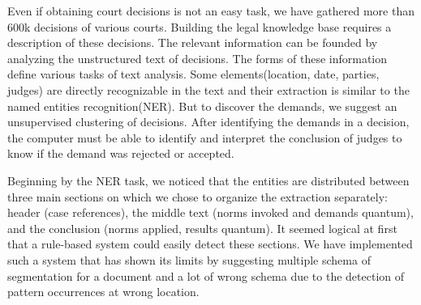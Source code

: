 \documentclass[runningheads,a4paper]{llncs}
\begin{document}
Even if obtaining court decisions is not an easy task, we have gathered more than 600k decisions of various courts. Building the legal knowledge base requires a description of these decisions. The relevant information can be founded by analyzing the unstructured text of decisions. The forms of these information define various tasks of text analysis. Some elements(location, date, parties, judges) are directly recognizable in the text and their extraction is similar to the named entities recognition(NER). But to discover the demands, we suggest an unsupervised clustering of decisions. After identifying the demands in a decision, the computer must be able to identify and interpret the  conclusion of judges to know if the demand was rejected or accepted.

Beginning by the NER task, we noticed that the entities are distributed between three main sections on which we chose to organize the extraction separately: header (case references), the middle text (norms invoked and demands quantum), and the conclusion (norms applied, results quantum). It seemed logical at first that a rule-based system could easily detect these sections. We have implemented such a system that has shown its limits by suggesting multiple schema of segmentation for a document and a lot of wrong schema due to the detection of pattern occurrences at wrong location. 
\end{document}
